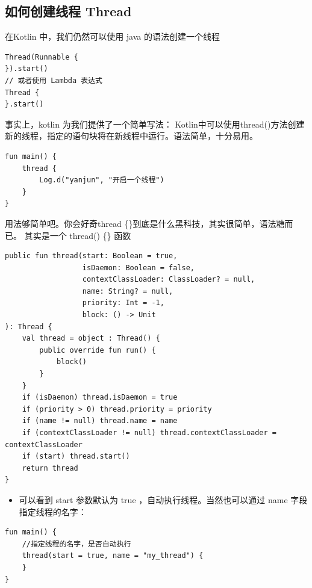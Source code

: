 \documentclass[9pt, b5paper]{article}
\begin{document}
\subsection{如何创建线程 Thread}
\label{sec-5-1}
在Kotlin 中，我们仍然可以使用 java 的语法创建一个线程
\begin{verbatim}
Thread(Runnable { 
}).start()
// 或者使用 Lambda 表达式
Thread {
}.start()
\end{verbatim}
事实上，kotlin 为我们提供了一个简单写法：
Kotlin中可以使用thread()方法创建新的线程，指定的语句块将在新线程中运行。语法简单，十分易用。
\begin{verbatim}
fun main() {
    thread {
        Log.d("yanjun", "开启一个线程")
    }
}
\end{verbatim}
用法够简单吧。你会好奇thread \{\}到底是什么黑科技，其实很简单，语法糖而已。 其实是一个 thread() \{\} 函数
\begin{verbatim}
public fun thread(start: Boolean = true,
                  isDaemon: Boolean = false,
                  contextClassLoader: ClassLoader? = null,
                  name: String? = null,
                  priority: Int = -1,
                  block: () -> Unit
): Thread {
    val thread = object : Thread() {
        public override fun run() {
            block()
        }
    }
    if (isDaemon) thread.isDaemon = true
    if (priority > 0) thread.priority = priority
    if (name != null) thread.name = name
    if (contextClassLoader != null) thread.contextClassLoader = contextClassLoader
    if (start) thread.start()   
    return thread
}
\end{verbatim}
\begin{itemize}
\item 可以看到 start 参数默认为 true ，自动执行线程。当然也可以通过 name 字段指定线程的名字：
\end{itemize}
\begin{verbatim}
fun main() {
    //指定线程的名字，是否自动执行
    thread(start = true, name = "my_thread") {
    }
}
\end{verbatim}
\end{document}
